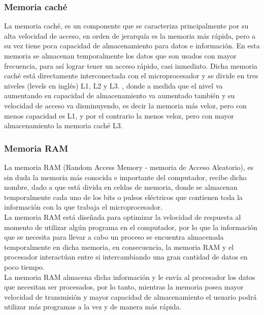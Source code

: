 \documentclass{article}
\begin{document}
\subsubsection{Memoria caché}
La memoria caché, es un componente que se caracteriza principalmente por su alta velocidad de acceso, en orden de jerarquía es la memoria más rápida, pero a su vez tiene poca capacidad de almacenamiento para datos e información. En esta memoria se almacenan temporalmente los datos que son usados con mayor frecuencia, para así lograr tener un acceso rápido, casi inmediato\cite{arquitectura}. Dicha memoria caché está directamente interconectada con el microprocesador y se divide en tres niveles (levels en inglés) L1, L2 y L3. \cite{augusto}, donde a medida que el nivel va aumentando su capacidad de almacenamiento va aumentado también y su velocidad de acceso va disminuyendo, es decir la memoria más veloz, pero con menos capacidad es L1, y por el contrario la menos veloz, pero con mayor almacenamiento la memoria caché L3.


\subsubsection{Memoria RAM}
La memoria RAM (Random Access Memory - memoria de Acceso Aleatorio), es sin duda la memoria más conocida e importante del computador, recibe dicho nombre, dado a que está divida en celdas de memoria, donde se almacenan temporalmente cada uno de los bits o pulsos eléctricos que contienen toda la información con la que trabaja el microprocesador. \cite{augusto}\\

La memoria RAM está diseñada para optimizar la velocidad de respuesta al momento de utilizar algún
programa en el computador, por lo que la información que se necesita para llevar a cabo un proceso se encuentra almacenada temporalmente en dicha memoria, en consecuencia, la memoria RAM y el procesador interactúan entre si intercambiando una gran cantidad de datos en poco tiempo.\\

La memoria RAM almacena dicha información y le envía al procesador los datos que necesitan
ser procesados, por lo tanto, mientras la memoria posea mayor velocidad de transmisión y mayor capacidad de almacenamiento el usuario podrá utilizar más programas a la vez y de manera más rápida. \cite{apuntes}\\\\


\noindent
\end{document}
